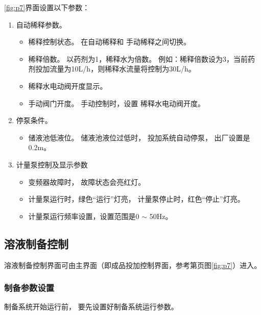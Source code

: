             \ref{fig:p7}界面设置以下参数：
            \begin{enumerate}
                \item   自动稀释参数。
                    \begin{itemize}
                        \item 稀释控制状态。
                            在自动稀释和 手动稀释之间切换。
                        \item 稀释倍数。
                        以药剂为1，稀释水为倍数。
                        例如：稀释倍数设为3，当前药剂投加流量为10L/h，则稀释水流量将控制为30L/h。
                        \item 稀释水电动阀开度显示。
                        \item 手动阀门开度。
                            手动控制时，设置 稀释水电动阀开度。
                    \end{itemize}
                \item 停泵条件。
                    \begin{itemize}
                    \item 储液池低液位。
                    储液池液位过低时，
                    投加系统自动停泵，
                    出厂设置是0.2m。
                    \end{itemize}
                \item 计量泵控制及显示参数
                    \begin{itemize}
                        \item 变频器故障时，
                            故障状态会亮红灯。
                        \item 计量泵运行时，绿色“运行”灯亮，
                            计量泵停止时，红色“停止”灯亮。
                        \item 计量泵运行频率设置，设置范围是0 $\sim$ 50Hz。
                    \end{itemize}
            \end{enumerate}


   \subsection{溶液制备控制}
       溶液制备控制界面可由主界面（即成品投加控制界面，参考第\pageref{fig:p7}页图\ref{fig:p7}）进入。

      \subsubsection{制备参数设置}
      制备系统开始运行前，
      要先设置好制备系统运行参数。

